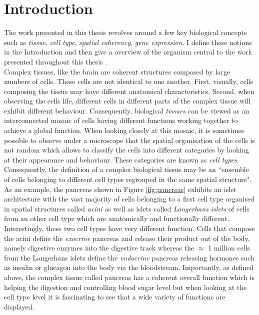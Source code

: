 %
\chapter{Introduction}\label{ch:background}
%
	
	The work presented in this thesis revolves around a few key biological concepts such as \emph{tissue}, \emph{cell type}, \emph{spatial coherency}, \emph{gene expression}. I define these notions in the Introduction and then give a overview of the organism central to the work presented throughout this thesis \platyfull{}.\\
	
    Complex tissues, like the brain are coherent structures composed by large numbers of cells. These cells are not identical to one another. First, visually, cells composing the tissue may have different anatomical characteristics. Second, when observing the cells life, different cells in different parts of the complex tissue will exhibit different behaviour. Consequently, biological \emph{tissues} can be viewed as an interconnected mosaic of cells having different functions working together to achieve a global function. When looking closely at this mosaic, it is sometimes possible to observe under a microscope \cite{young13} that the spatial organisation of the cells is not random which allows to classify the cells into different categories by looking at their appearance and behaviour. These categories are known as \emph{cell types}. Consequently, the definition of a complex biological tissue may be an ``ensemble of cells belonging to different cell types regrouped in the same spatial structure".\\
    
     As an example, the pancreas shown in Figure \ref{fig:pancreas} exhibits an islet architecture \cite{brissova05} with the vast majority of cells belonging to a first cell type organised in spatial structures called \emph{acini} as well as islets called \emph{Langerhans islets} of cells from an other cell type which are anatomically and functionally different.\\
     
      Interestingly, these two cell types have very different function. Cells that compose the acini define the \emph{exocrine} pancreas and release their product out of the body, namely digestive enzymes into the digestive track \cite{rodriguez11} whereas the $\approx$ 1 million cells \cite{hellman09} from the Langerhans islets define the \emph{endocrine} pancreas releasing hormones such as insulin or glucagon into the body via the bloodstream. Importantly, as defined above, the complex tissue called pancreas has a coherent overall function which is helping the digestion and controlling blood sugar level but when looking at the cell type level it is fascinating to see that a wide variety of functions are displayed.\\
     
